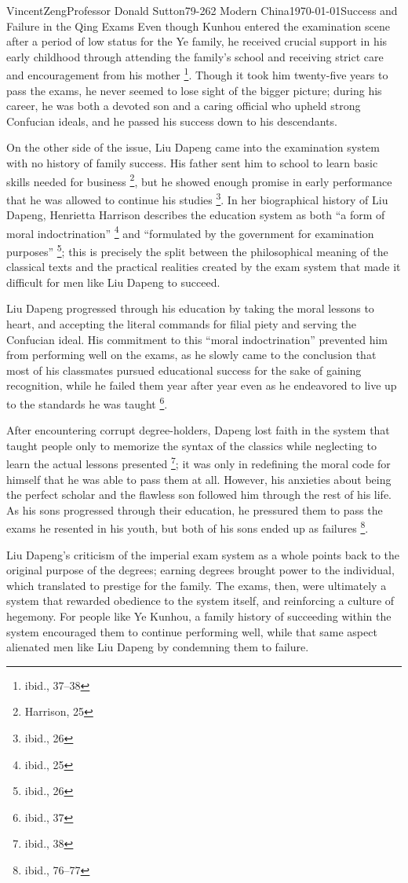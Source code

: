 \documentclass[12pt]{article}
\begin{document}
\begin{mla}{Vincent}{Zeng}{Professor Donald Sutton}{79-262 Modern China}{\today}{Success and Failure in the Qing Exams}
Even though Kunhou entered the examination scene after a period of low status
for the Ye family, he received crucial support in his early childhood through
attending the family's school and receiving strict care and encouragement from
his mother \footnote{ibid., 37--38}. Though it took him twenty-five years to
pass the exams, he never seemed to lose sight of the bigger picture; during his
career, he was both a devoted son and a caring official who upheld strong
Confucian ideals, and he passed his success down to his descendants.

On the other side of the issue, Liu Dapeng came into the examination system
with no history of family success. His father sent him to school to learn basic
skills needed for business \footnote{Harrison, 25}, but he showed enough
promise in early performance that he was allowed to continue his studies
\footnote{ibid., 26}. In her biographical history of Liu Dapeng, Henrietta
Harrison describes the education system as both ``a form of moral
indoctrination'' \footnote{ibid., 25} and ``formulated by the government for
examination purposes'' \footnote{ibid., 26}; this is precisely the split
between the philosophical meaning of the classical texts and the practical
realities created by the exam system that made it difficult for men like Liu Dapeng to succeed.

Liu Dapeng progressed through his education by taking the moral lessons to heart,
and accepting the literal commands for filial piety and serving the Confucian
ideal. His commitment to this ``moral indoctrination'' prevented him from
performing well on the exams, as he slowly came to the conclusion that most of
his classmates pursued educational success for the sake of gaining
recognition, while he failed them year after year even as he endeavored to live
up to the standards he was taught \footnote{ibid., 37}. 

After encountering corrupt degree-holders, Dapeng lost faith in the system that
taught people only to memorize the syntax of the classics while neglecting to
learn the actual lessons presented \footnote{ibid., 38}; it was only in
redefining the moral code for himself that he was able to pass them at all.
However, his anxieties about being the perfect scholar and the flawless son
followed him through the rest of his life. As his sons progressed through their
education, he pressured them to pass the exams he resented in his youth, but
both of his sons ended up as failures \footnote{ibid., 76--77}.

Liu Dapeng's criticism of the imperial exam system as a whole points back to the
original purpose of the degrees; earning degrees brought power to the
individual, which translated to prestige for the family. The exams, then, were
ultimately a system that rewarded obedience to the system itself, and
reinforcing a culture of hegemony. For people like Ye Kunhou, a family history
of succeeding within the system encouraged them to continue performing well,
while that same aspect alienated men like Liu Dapeng by condemning
them to failure.


\end{mla}
\end{document}
